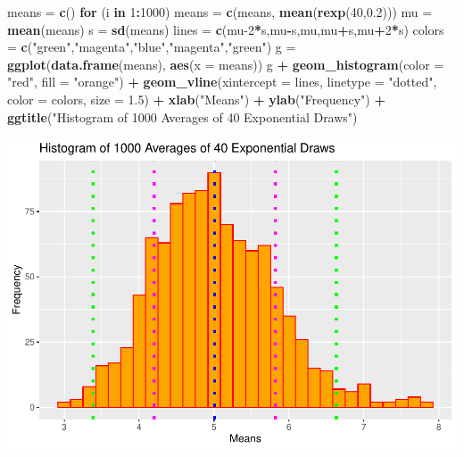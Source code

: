 \documentclass[
]{article}
\newenvironment{Shaded}{\begin{snugshade}}{\end{snugshade}}
\newcommand{\ControlFlowTok}[1]{\textcolor[rgb]{0.13,0.29,0.53}{\textbf{#1}}}
\newcommand{\DataTypeTok}[1]{\textcolor[rgb]{0.13,0.29,0.53}{#1}}
\newcommand{\DecValTok}[1]{\textcolor[rgb]{0.00,0.00,0.81}{#1}}
\newcommand{\FloatTok}[1]{\textcolor[rgb]{0.00,0.00,0.81}{#1}}
\newcommand{\KeywordTok}[1]{\textcolor[rgb]{0.13,0.29,0.53}{\textbf{#1}}}
\newcommand{\NormalTok}[1]{#1}
\newcommand{\OperatorTok}[1]{\textcolor[rgb]{0.81,0.36,0.00}{\textbf{#1}}}
\newcommand{\StringTok}[1]{\textcolor[rgb]{0.31,0.60,0.02}{#1}}
\begin{document}
\begin{Shaded}
\begin{Highlighting}[]
\NormalTok{means =}\StringTok{ }\KeywordTok{c}\NormalTok{()}
\ControlFlowTok{for}\NormalTok{ (i }\ControlFlowTok{in} \DecValTok{1}\OperatorTok{:}\DecValTok{1000}\NormalTok{)}
\NormalTok{  means =}\StringTok{ }\KeywordTok{c}\NormalTok{(means, }\KeywordTok{mean}\NormalTok{(}\KeywordTok{rexp}\NormalTok{(}\DecValTok{40}\NormalTok{,}\FloatTok{0.2}\NormalTok{)))}
\NormalTok{mu =}\StringTok{ }\KeywordTok{mean}\NormalTok{(means)}
\NormalTok{s =}\StringTok{ }\KeywordTok{sd}\NormalTok{(means)}
\NormalTok{lines =}\StringTok{ }\KeywordTok{c}\NormalTok{(mu}\DecValTok{-2}\OperatorTok{*}\NormalTok{s,mu}\OperatorTok{-}\NormalTok{s,mu,mu}\OperatorTok{+}\NormalTok{s,mu}\OperatorTok{+}\DecValTok{2}\OperatorTok{*}\NormalTok{s)}
\NormalTok{colors =}\StringTok{ }\KeywordTok{c}\NormalTok{(}\StringTok{"green"}\NormalTok{,}\StringTok{"magenta"}\NormalTok{,}\StringTok{"blue"}\NormalTok{,}\StringTok{"magenta"}\NormalTok{,}\StringTok{"green"}\NormalTok{)}
\NormalTok{g =}\StringTok{ }\KeywordTok{ggplot}\NormalTok{(}\KeywordTok{data.frame}\NormalTok{(means), }\KeywordTok{aes}\NormalTok{(}\DataTypeTok{x =}\NormalTok{ means))}
\NormalTok{g }\OperatorTok{+}\StringTok{ }\KeywordTok{geom_histogram}\NormalTok{(}\DataTypeTok{color =} \StringTok{"red"}\NormalTok{, }\DataTypeTok{fill =} \StringTok{"orange"}\NormalTok{) }\OperatorTok{+}
\StringTok{  }\KeywordTok{geom_vline}\NormalTok{(}\DataTypeTok{xintercept =}\NormalTok{ lines, }\DataTypeTok{linetype =} \StringTok{"dotted"}\NormalTok{, }\DataTypeTok{color =}\NormalTok{ colors, }\DataTypeTok{size =} \FloatTok{1.5}\NormalTok{) }\OperatorTok{+}
\StringTok{  }\KeywordTok{xlab}\NormalTok{(}\StringTok{"Means"}\NormalTok{) }\OperatorTok{+}
\StringTok{  }\KeywordTok{ylab}\NormalTok{(}\StringTok{"Frequency"}\NormalTok{) }\OperatorTok{+}
\StringTok{  }\KeywordTok{ggtitle}\NormalTok{(}\StringTok{"Histogram of 1000 Averages of 40 Exponential Draws"}\NormalTok{)}
\end{Highlighting}
\end{Shaded}

\includegraphics{C6Project_files/figure-latex/normality-1.pdf}
\end{document}
